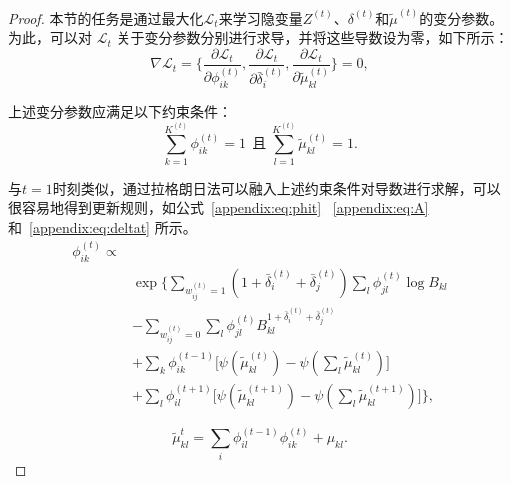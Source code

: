 \begin{proof}
	本节的任务是通过最大化$\mathscr{L}_t$来学习隐变量$Z^{(t)}$、$\delta^{(t)}$和$\tilde{\mu}^{(t)}$的变分参数。为此，可以对 $\mathscr{L}_t$ 关于变分参数分别进行求导，并将这些导数设为零，如下所示：
	\begin{equation}
		\nabla \mathscr{L}_t = \bigg\{ \frac{\partial \mathscr{L}_t}{\partial \phi_{ik}^{(t)}},\frac{\partial \mathscr{L}_t}{\partial \bar{\delta}_i^{(t)}},\frac{\partial \mathscr{L}_t}{\partial \tilde{\mu}_{kl}^{(t)}} \bigg\} = 0,
	\end{equation}
	
	上述变分参数应满足以下约束条件：
	\begin{equation}
		\sum_{k=1}^{K^{(t)}} \phi_{ik}^{(t)} =1 ~~\text{且} \; \sum_{l=1}^{K^{(t)}} \tilde{\mu}_{kl}^{(t)} =1.
		\label{appendix:cons}
	\end{equation}
	
	与$t=1$时刻类似，通过拉格朗日法可以融入上述约束条件对导数进行求解，可以很容易地得到更新规则，如公式~\ref{appendix:eq:phit} ~\ref{appendix:eq:A}和~\ref{appendix:eq:deltat} 所示。
	\begin{equation}
		\begin{split}
			\phi_{ik}^{(t)} \propto \\
			&\exp\bigg\{ \sum_{w_{ij}^{(t)}=1} (1+\bar{\delta}_i^{(t)}+\bar{\delta}_j^{(t)}) \sum_l \phi_{jl}^{(t)} \log B_{kl} \\
			& -\sum_{w_{ij}^{(t)}=0} \sum_l \phi_{jl}^{(t)}  B_{kl}^{1+\bar{\delta}_i^{(t)}+\bar{\delta}_j^{(t)}}  \\
			& +\sum_k \phi_{ik}^{(t-1)} \Big[\psi(\tilde{\mu}_{kl}^{(t)}) - \psi(\sum_l \tilde{\mu}_{kl}^{(t)})\Big] \\
			&+ \sum_l \phi_{il}^{(t+1)} \Big[\psi(\tilde{\mu}_{kl}^{(t+1)}) - \psi(\sum_l \tilde{\mu}_{kl}^{(t+1)})\Big] \bigg\},
			\label{appendix:eq:phit}
		\end{split}
	\end{equation}
	
	\begin{equation}
		\tilde{\mu}_{kl}^t = \sum_i \phi_{il}^{(t-1)} \phi_{ik}^{(t)} + \mu_{kl}.
		\label{appendix:eq:A}
	\end{equation}
	
	

\end{proof}
